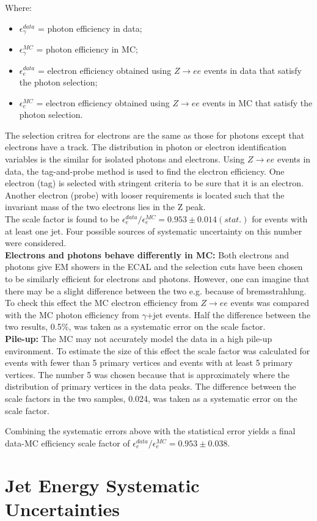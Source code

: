 Where:
\begin{itemize}
\item $\epsilon_{\gamma}^{data}$ = photon efficiency in data;
\item $\epsilon_{\gamma}^{MC}$ = photon efficiency in MC;
\item $\epsilon_{e}^{data}$ = electron efficiency obtained using $Z\rightarrow
ee$ events in data that satisfy the photon selection; 
\item $\epsilon_{e}^{MC}$ = electron efficiency obtained using $Z\rightarrow ee$
events in MC that satisfy the photon selection. 
\end{itemize}

The selection critrea for electrons are the same as those for photons except 
that electrons have a track. The distribution in photon or electron 
identification variables is the similar for isolated photons and electrons. 
Using $Z\rightarrow ee$ events in data, the tag-and-probe method is used to find
the electron efficiency. One electron (tag) is selected with stringent criteria 
to be sure that it is an electron. Another electron (probe) with looser 
requirements is located such that the invariant mass of the two electrons lies 
in the Z peak. \\

The scale factor is found to be $\epsilon_{e}^{data}/\epsilon_{e}^{MC} =
0.953\pm 0.014(stat.)$ for events with at least one jet. Four possible sources
of systematic uncertainty on this number were considered. \\

{\bf Electrons and photons behave differently in MC:} Both electrons and photons
give EM showers in the ECAL and the selection cuts have been chosen to be
similarly efficient for electrons and photons. However, one can imagine that
there may be a slight difference between the two e.g. because of bremsstrahlung.
To check this effect the MC electron efficiency from $Z\rightarrow ee$ events
was compared with the MC photon efficiency from $\gamma$+jet events. Half the
difference between the two results, 0.5\%, was taken as a systematic error on
the scale factor. \\

{\bf Pile-up:} The MC may not accurately model the data in a high pile-up
environment. To estimate the size of this effect the scale factor was calculated
for events with fewer than 5 primary vertices and events with at least 5 primary
vertices. The number 5 was chosen because that is approximately where the 
distribution of primary vertices in the data peaks. The difference between the
scale factors in the two samples, 0.024, was taken as a systematic error on the 
scale factor. \\

{\bf }

Combining the systematic errors above with the statistical error yields a final
data-MC efficiency scale factor of $\epsilon_{e}^{data}/\epsilon_{e}^{MC} =
0.953\pm0.038$.

\section{Jet Energy Systematic Uncertainties}
